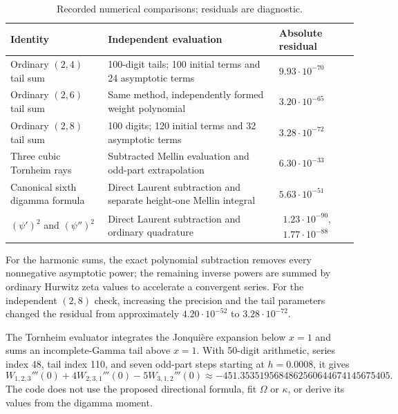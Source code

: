 \documentclass[11pt,a4paper]{article}
\numberwithin{equation}{section}
\theoremstyle{plain}
\theoremstyle{definition}
\theoremstyle{remark}
\begin{document}
\begin{table}[htbp]
\centering\small
\caption{Recorded numerical comparisons; residuals are diagnostic.}
\label{tab:numerics}
\begin{tabular}{@{}p{}p{}>{\raggedleft\arraybackslash}p{}@{}}
\toprule
Identity & Independent evaluation & Absolute residual\\
\midrule
Ordinary $(2,4)$ tail sum & 100-digit tails; 100 initial terms and 24 asymptotic terms
 & $9.93\cdot10^{-70}$\\[5pt]
Ordinary $(2,6)$ tail sum & Same method, independently formed weight polynomial
 & $3.20\cdot10^{-65}$\\[5pt]
Ordinary $(2,8)$ tail sum & 100 digits; 120 initial terms and 32 asymptotic terms
 & $3.28\cdot10^{-72}$\\[5pt]
Three cubic Tornheim rays & Subtracted Mellin evaluation and odd-part extrapolation
 & $6.30\cdot10^{-33}$\\[5pt]
Canonical sixth digamma formula & Direct Laurent subtraction and separate height-one Mellin integral
 & $5.63\cdot10^{-51}$\\[5pt]
$(\psi')^2$ and $(\psi'')^2$ & Direct Laurent subtraction and ordinary quadrature
 & $\begin{gathered}1.23\cdot10^{-90},\\1.77\cdot10^{-88}\end{gathered}$\\
\bottomrule
\end{tabular}
\end{table}

For the harmonic sums, the exact polynomial subtraction removes every
nonnegative asymptotic power; the remaining inverse powers are summed
by ordinary Hurwitz zeta values to accelerate a convergent series.
For the independent $(2,8)$ check, increasing the precision and the
tail parameters changed the residual from approximately
$4.20\cdot10^{-52}$ to $3.28\cdot10^{-72}$.

The Tornheim evaluator integrates the Jonqui\`ere expansion below $x=1$
and sums an incomplete-Gamma tail above $x=1$. With 50-digit arithmetic,
series index 48, tail index 110, and seven odd-part steps starting at
$h=0.0008$, it gives
\[
 W_{1,2,3}'''(0)+4W_{2,3,1}'''(0)-5W_{3,1,2}'''(0)
 \approx-451.3535195684862560644674145675405.
\]
The code does not use the proposed directional formula, fit $\Omega$
or $\kappa$, or derive its values from the digamma moment.
\end{document}
